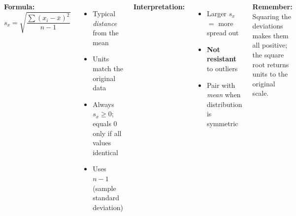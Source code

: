 \documentclass[aspectratio=169, 11pt]{beamer}
\begin{document}
{
\begin{frame}[t, plain]
  \vspace{1em}%
  \hspace{0.55cm}%
  \begin{minipage}{0.9\textwidth}
    \begin{columns}[t]
        \small
        \textbf{\color{navy}Formula:}
        \[s_x = \sqrt{\frac{\sum(x_i - \bar{x})^2}{n-1}}\]
        \begin{itemize}\setlength{\itemsep}{0.4em}
          \item Typical \textit{distance} from the mean
          \item Units match the original data
          \item Always $s_x \geq 0$; equals 0 only if all values identical
          \item Uses $n-1$ (sample standard deviation)
        \end{itemize}

        \small
        \textbf{\color{navy}Interpretation:}
        \begin{itemize}\setlength{\itemsep}{0.4em}
          \item Larger $s_x$ $=$ more spread out
          \item \textbf{Not resistant} to outliers
          \item Pair with \textit{mean} when distribution is symmetric
        \end{itemize}
        \vspace{0.3cm}
        \textbf{\color{navy}Remember:} Squaring the deviations makes them all positive;
        the square root returns units to the original scale.
    \end{columns}
  \end{minipage}
\end{frame}
}
\end{document}
